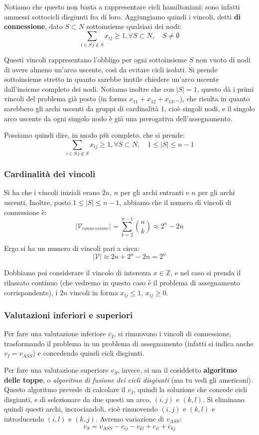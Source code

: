 \documentclass[a4paper,11pt]{article}
\begin{document}
Notiamo che questo non basta a rappresentare cicli hamiltoniani: sono infatti ammessi sottocicli disgiunti fra di loro. 
Aggiungiamo quindi i vincoli, detti \textbf{di connessione}, dato $S \subset N$ sottoinsieme qualsiasi dei nodi:
$$
\sum_{i \in S \, j \notin S} x_{ij} \geq 1, \forall S \subset N, \quad S \neq \emptyset
$$

Questi vincoli rappresentano l'obbligo per ogni sottoinsieme $S$ non vuoto di nodi di avere almeno un'arco uscente, così da evitare cicli isolati.
Si prende sottoinsieme stretto in quanto sarebbe inutile chiedere un'arco uscente dall'insieme completo dei nodi.
Notiamo inoltre che con $|S| = 1$, questo dà i primi vincoli del problema già posto (in forma $x_{11} + x_{12} + x_{13} ...$), che risulta in quanto sarebbero gli archi uscenti da gruppi di cardinalità 1, cioè singoli nodi, e il singolo arco uscente da ogni singolo nodo è già una prerogativa dell'assegnamento.

Possiamo quindi dire, in modo più completo, che si prende:
$$
\sum_{i \in S \, j \notin S} x_{ij} \geq 1, \forall S \subset N, \quad 1 \leq |S| \leq n - 1
$$

\TODO

\subsubsection{Cardinalità dei vincoli}

Si ha che i vincoli iniziali erano $2n$, $n$ per gli archi entranti e $n$ per gli archi uscenti. 
Inoltre, posto $1 \leq |S| \leq n - 1$, abbiamo che il numero di vincoli di connessione è:
$$
|\mathcal{V}_{connessione}| = \sum_{k=2}^{n-1} \binom{n}{k} \approx 2^n - 2n
$$ 

Ergo si ha un numero di vincoli pari a circa:
$$
|\mathcal{V}| \approx 2n + 2^n - 2n = 2^n
$$

Dobbiamo poi considerare il vincolo di interezza $x \in \mathbb{Z}$, e nel caso si prenda il rilassato continuo (che vedremo in questo caso è il problema di assegnamento corrispondente), i $2n$ vincoli in forma $x_{ij} \leq 1$, $x_{ij} \geq 0$.

\subsubsection{Valutazioni inferiori e superiori}
Per fare una valutazione inferiore $v_I$, si rimuovono i vincoli di connessione, trasformando il problema in un problema di assegnamento (infatti si indica anche $v_I = v_{ASS}$) e concedendo quindi cicli disgiunti. 

Per fare una valutazione superiore $v_S$, invece, si usa il cosiddetto \textbf{algoritmo delle toppe}, o \textit{algoritmo di fusione dei cicli disgiunti} (ma tu vedi gli americani).
Questo algoritmo prevede di calcolare il $v_I$, quindi la soluzione che concede cicli disgiunti, e di selezionare da due questi un arco, $(i, j)$ e $(k, l)$.
Si eliminano quindi questi archi, incrociandoli, cioè rimuovendo $(i, j)$ e $(k, l)$ e introducendo $(i,l)$ e $(k, j)$.
Avremo variazione di $v_{ASS}$:
$$ 
v_S = v_{ASS} - c_{ij} - c_{kl} + c_{il} + c_{kj} 
$$
\end{document}
